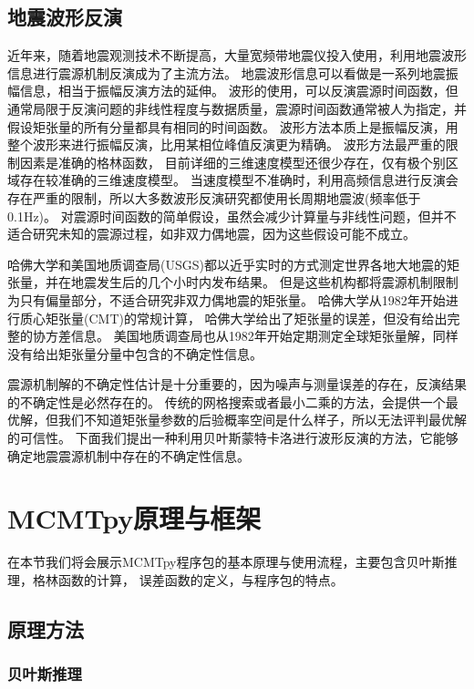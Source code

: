 \subsection{地震波形反演}
近年来，随着地震观测技术不断提高，大量宽频带地震仪投入使用，利用地震波形信息进行震源机制反演成为了主流方法。
地震波形信息可以看做是一系列地震振幅信息，相当于振幅反演方法的延伸。
波形的使用，可以反演震源时间函数，但通常局限于反演问题的非线性程度与数据质量，震源时间函数通常被人为指定，并假设矩张量的所有分量都具有相同的时间函数。
波形方法本质上是振幅反演，用整个波形来进行振幅反演，比用某相位峰值反演更为精确。
波形方法最严重的限制因素是准确的格林函数，
目前详细的三维速度模型还很少存在，仅有极个别区域存在较准确的三维速度模型。
当速度模型不准确时，利用高频信息进行反演会存在严重的限制，所以大多数波形反演研究都使用长周期地震波(频率低于0.1Hz)。
对震源时间函数的简单假设，虽然会减少计算量与非线性问题，但并不适合研究未知的震源过程，如非双力偶地震，因为这些假设可能不成立。

哈佛大学和美国地质调查局(USGS)都以近乎实时的方式测定世界各地大地震的矩张量，并在地震发生后的几个小时内发布结果。
但是这些机构都将震源机制限制为只有偏量部分，不适合研究非双力偶地震的矩张量。
哈佛大学从1982年开始进行质心矩张量(CMT)的常规计算，
哈佛大学给出了矩张量的误差，但没有给出完整的协方差信息。
美国地质调查局也从1982年开始定期测定全球矩张量解，同样没有给出矩张量分量中包含的不确定性信息。

震源机制解的不确定性估计是十分重要的，因为噪声与测量误差的存在，反演结果的不确定性是必然存在的。
传统的网格搜索或者最小二乘的方法，会提供一个最优解，但我们不知道矩张量参数的后验概率空间是什么样子，所以无法评判最优解的可信性。
下面我们提出一种利用贝叶斯蒙特卡洛进行波形反演的方法，它能够确定地震震源机制中存在的不确定性信息。



\section{MCMTpy原理与框架}

在本节我们将会展示MCMTpy程序包的基本原理与使用流程，主要包含贝叶斯推理，格林函数的计算，
误差函数的定义，与程序包的特点。


\subsection{原理方法}

\subsubsection{贝叶斯推理}

